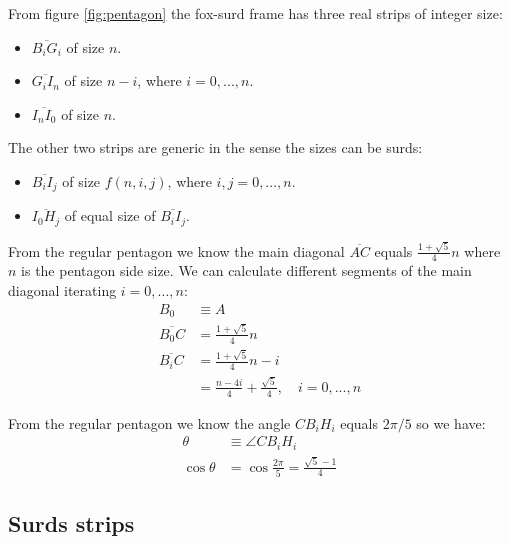 \documentclass[11pt]{article}
\begin{document}
From figure \ref{fig:pentagon} the fox-surd frame has three real strips of integer size:
\begin{itemize}
    \item $\overline{B_iG_i}$ of size $n$.
    \item $\overline{G_iI_n}$ of size $n-i$, where $i = 0,...,n$.
    \item $\overline{I_nI_0}$ of size $n$.
\end{itemize}
The other two strips are generic in the sense the sizes can be surds:
\begin{itemize}
	\item $\overline{B_iI_j}$ of size $f(n,i,j)$, where $i,j = 0,...,n$.
	\item $\overline{I_0H_j}$ of equal size of $\overline{B_iI_j}$.
\end{itemize}

From the regular pentagon we know the main diagonal $\overline{AC}$ equals
$\frac{1+\sqrt{5}}{4}n$ where $n$ is the pentagon side size. We can calculate different
segments of the main diagonal iterating $i = 0,...,n$:
\begin{align}
B_0 &\equiv A \nonumber\\
\overline{B_0C} &= \frac{1+\sqrt{5}}{4}n \\
\overline{B_iC} &= \frac{1+\sqrt{5}}{4}n - i \nonumber\\
 &= \frac{n-4i}{4} + \frac{\sqrt{5}}{4}, \quad i = 0, ..., n \label{eq:B_iC}
\end{align}

From the regular pentagon we know the angle ${CB_iH_i}$ equals $2\pi / 5$ so we have:
\begin{align}
\theta &\equiv \angle{CB_iH_i} \\
\cos\theta &= \cos\frac{2\pi}{5} = \frac{\sqrt{5}-1}{4} \label{eq:cosine}
\end{align}

\subsection{Surds strips}
\end{document}
